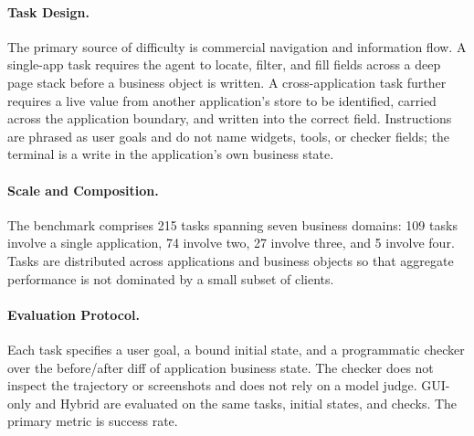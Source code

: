 \paragraph{Task Design.}
The primary source of difficulty is commercial navigation and information flow. A single-app task requires the agent to locate, filter, and fill fields across a deep page stack before a business object is written. A cross-application task further requires a live value from another application's store to be identified, carried across the application boundary, and written into the correct field. Instructions are phrased as user goals and do not name widgets, tools, or checker fields; the terminal is a write in the application's own business state.

\paragraph{Scale and Composition.}
The benchmark comprises 215 tasks spanning seven business domains: 109 tasks involve a single application, 74 involve two, 27 involve three, and 5 involve four. Tasks are distributed across applications and business objects so that aggregate performance is not dominated by a small subset of clients.

\paragraph{Evaluation Protocol.}
Each task specifies a user goal, a bound initial state, and a programmatic checker over the before/after diff of application business state. The checker does not inspect the trajectory or screenshots and does not rely on a model judge. GUI-only and Hybrid are evaluated on the same tasks, initial states, and checks. The primary metric is success rate.

